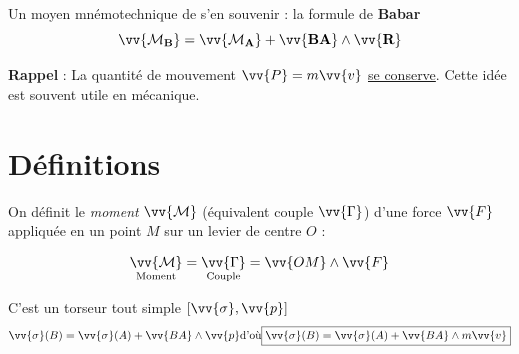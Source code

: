 \documentclass[11pt,a4paper,fleqn,pdftex]{report}
\begin{document}
\begin{theorem}
Un moyen mnémotechnique de s'en souvenir : la formule de \og \textbf{Babar} \fg{}
\begin{equation}\label{Varignon}
\vv{\mathcal{M}_\textbf{B}}=\vv{\mathcal{M}_\textbf{A}}+\vv{\textbf{BA}} \wedge \vv{\mathcal{\textbf{R}}}
\end{equation}
\end{theorem}
%
\textbf{Rappel} : La quantité de mouvement $\vv{P}=m\vv{v}$ \uline{se conserve}. Cette idée est souvent utile en mécanique.
\section{Définitions}
\begin{dfn}
On définit le \emph{moment} $\vv{\mathcal{M}}$ (équivalent couple $\vv{\Gamma}$) d'une force $\vv{F}$ appliquée en un point $M$ sur un levier de centre $O$ :\\
%
\hspace{1.5\oddsidemargin}\begin{minipage}[c]{0.4\textwidth}
	\begin{equation}
	\underset{\text{Moment}}{\vv{\mathcal{M}}}=\underset{\text{Couple}}{\vv{\Gamma}}=\vv{OM}\wedge\vv{F}
	\end{equation}
\end{minipage}\hspace{0.1\textwidth}
\begin{minipage}[c]{0.3\textwidth}
\end{minipage}
%
\end{dfn}
\begin{dfn}
C'est un torseur tout simple $\left[\vv{\sigma},\vv{p}\right]$
\begin{equation}
\vv{\sigma}(B)=\vv{\sigma}(A)+\vv{BA}\wedge\vv{p}\\ \text{d'où} \\
\boxed{\vv{\sigma}(B)=\vv{\sigma}(A)+\vv{BA}\wedge{}m\vv{v}}
\end{equation}
\end{dfn}
\end{document}
